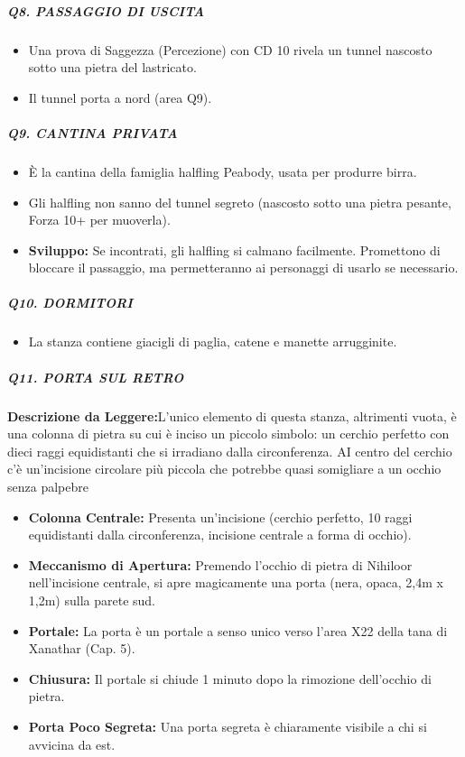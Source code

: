 \documentclass{article}
\begin{document}
\subparagraph{Q8. PASSAGGIO DI USCITA}
\begin{itemize}
    \item Una prova di Saggezza (Percezione) con CD 10 rivela un tunnel nascosto sotto una pietra del lastricato.
    \item Il tunnel porta a nord (area Q9).
\end{itemize}

\subparagraph{Q9. CANTINA PRIVATA}
\begin{itemize}
    \item È la cantina della famiglia halfling Peabody, usata per produrre birra.
    \item Gli halfling non sanno del tunnel segreto (nascosto sotto una pietra pesante, Forza 10+ per muoverla).
    \item \textbf{Sviluppo:} Se incontrati, gli halfling si calmano facilmente. Promettono di bloccare il passaggio, ma permetteranno ai personaggi di usarlo se necessario.
\end{itemize}

\subparagraph{Q10. DORMITORI}
\begin{itemize}
    \item La stanza contiene giacigli di paglia, catene e manette arrugginite.
\end{itemize}
\subparagraph{Q11. PORTA SUL RETRO}
\textbf{Descrizione da Leggere:}L'unico elemento di questa stanza, altrimenti vuota, è
una colonna di pietra su cui è inciso un piccolo simbolo:
un cerchio perfetto con dieci raggi equidistanti che si
irradiano dalla circonferenza. AI centro del cerchio c'è
un'incisione circolare più piccola che potrebbe quasi
somigliare a un occhio senza palpebre
\begin{itemize}
    \item \textbf{Colonna Centrale:} Presenta un'incisione (cerchio perfetto, 10 raggi equidistanti dalla circonferenza, incisione centrale a forma di occhio).
    \item \textbf{Meccanismo di Apertura:} Premendo l'occhio di pietra di Nihiloor nell'incisione centrale, si apre magicamente una porta (nera, opaca, 2,4m x 1,2m) sulla parete sud.
    \item \textbf{Portale:} La porta è un portale a senso unico verso l'area X22 della tana di Xanathar (Cap. 5).
    \item \textbf{Chiusura:} Il portale si chiude 1 minuto dopo la rimozione dell'occhio di pietra.
    \item \textbf{Porta Poco Segreta:} Una porta segreta è chiaramente visibile a chi si avvicina da est.
\end{itemize}
\end{document}
